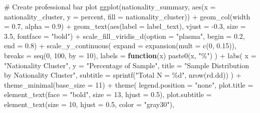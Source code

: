 \documentclass[
  12pt,
  letterpaper,
  DIV=11,
  numbers=noendperiod]{scrartcl}
\newenvironment{Shaded}{\begin{snugshade}}{\end{snugshade}}
\newcommand{\AttributeTok}[1]{\textcolor[rgb]{0.40,0.45,0.13}{#1}}
\newcommand{\CommentTok}[1]{\textcolor[rgb]{0.37,0.37,0.37}{#1}}
\newcommand{\ControlFlowTok}[1]{\textcolor[rgb]{0.00,0.23,0.31}{\textbf{#1}}}
\newcommand{\DecValTok}[1]{\textcolor[rgb]{0.68,0.00,0.00}{#1}}
\newcommand{\FloatTok}[1]{\textcolor[rgb]{0.68,0.00,0.00}{#1}}
\newcommand{\FunctionTok}[1]{\textcolor[rgb]{0.28,0.35,0.67}{#1}}
\newcommand{\NormalTok}[1]{\textcolor[rgb]{0.00,0.23,0.31}{#1}}
\newcommand{\SpecialCharTok}[1]{\textcolor[rgb]{0.37,0.37,0.37}{#1}}
\newcommand{\StringTok}[1]{\textcolor[rgb]{0.13,0.47,0.30}{#1}}
\theoremstyle{plain}
\theoremstyle{definition}
\begin{document}
\begin{Shaded}
\begin{Highlighting}[]
\CommentTok{\# Create professional bar plot}
\FunctionTok{ggplot}\NormalTok{(nationality\_summary, }\FunctionTok{aes}\NormalTok{(}\AttributeTok{x =}\NormalTok{ nationality\_cluster, }\AttributeTok{y =}\NormalTok{ percent, }\AttributeTok{fill =}\NormalTok{ nationality\_cluster)) }\SpecialCharTok{+}
  \FunctionTok{geom\_col}\NormalTok{(}\AttributeTok{width =} \FloatTok{0.7}\NormalTok{, }\AttributeTok{alpha =} \FloatTok{0.9}\NormalTok{) }\SpecialCharTok{+}
  \FunctionTok{geom\_text}\NormalTok{(}\FunctionTok{aes}\NormalTok{(}\AttributeTok{label =}\NormalTok{ label\_text),}
            \AttributeTok{vjust =} \SpecialCharTok{{-}}\FloatTok{0.3}\NormalTok{,}
            \AttributeTok{size =} \FloatTok{3.5}\NormalTok{,}
            \AttributeTok{fontface =} \StringTok{"bold"}\NormalTok{) }\SpecialCharTok{+}
  \FunctionTok{scale\_fill\_viridis\_d}\NormalTok{(}\AttributeTok{option =} \StringTok{"plasma"}\NormalTok{, }\AttributeTok{begin =} \FloatTok{0.2}\NormalTok{, }\AttributeTok{end =} \FloatTok{0.8}\NormalTok{) }\SpecialCharTok{+}
  \FunctionTok{scale\_y\_continuous}\NormalTok{(}
    \AttributeTok{expand =} \FunctionTok{expansion}\NormalTok{(}\AttributeTok{mult =} \FunctionTok{c}\NormalTok{(}\DecValTok{0}\NormalTok{, }\FloatTok{0.15}\NormalTok{)),}
    \AttributeTok{breaks =} \FunctionTok{seq}\NormalTok{(}\DecValTok{0}\NormalTok{, }\DecValTok{100}\NormalTok{, }\AttributeTok{by =} \DecValTok{10}\NormalTok{),}
    \AttributeTok{labels =} \ControlFlowTok{function}\NormalTok{(x) }\FunctionTok{paste0}\NormalTok{(x, }\StringTok{"\%"}\NormalTok{)}
\NormalTok{  ) }\SpecialCharTok{+}
  \FunctionTok{labs}\NormalTok{(}
    \AttributeTok{x =} \StringTok{"Nationality Cluster"}\NormalTok{,}
    \AttributeTok{y =} \StringTok{"Percentage of Sample"}\NormalTok{,}
    \AttributeTok{title =} \StringTok{"Sample Distribution by Nationality Cluster"}\NormalTok{,}
    \AttributeTok{subtitle =} \FunctionTok{sprintf}\NormalTok{(}\StringTok{"Total N = \%d"}\NormalTok{, }\FunctionTok{nrow}\NormalTok{(rd.dd))}
\NormalTok{  ) }\SpecialCharTok{+}
  \FunctionTok{theme\_minimal}\NormalTok{(}\AttributeTok{base\_size =} \DecValTok{11}\NormalTok{) }\SpecialCharTok{+}
  \FunctionTok{theme}\NormalTok{(}
    \AttributeTok{legend.position =} \StringTok{"none"}\NormalTok{,}
    \AttributeTok{plot.title =} \FunctionTok{element\_text}\NormalTok{(}\AttributeTok{face =} \StringTok{"bold"}\NormalTok{, }\AttributeTok{size =} \DecValTok{13}\NormalTok{, }\AttributeTok{hjust =} \FloatTok{0.5}\NormalTok{),}
    \AttributeTok{plot.subtitle =} \FunctionTok{element\_text}\NormalTok{(}\AttributeTok{size =} \DecValTok{10}\NormalTok{, }\AttributeTok{hjust =} \FloatTok{0.5}\NormalTok{, }\AttributeTok{color =} \StringTok{"gray30"}\NormalTok{),}

\end{Highlighting}
\end{Shaded}
\end{document}
